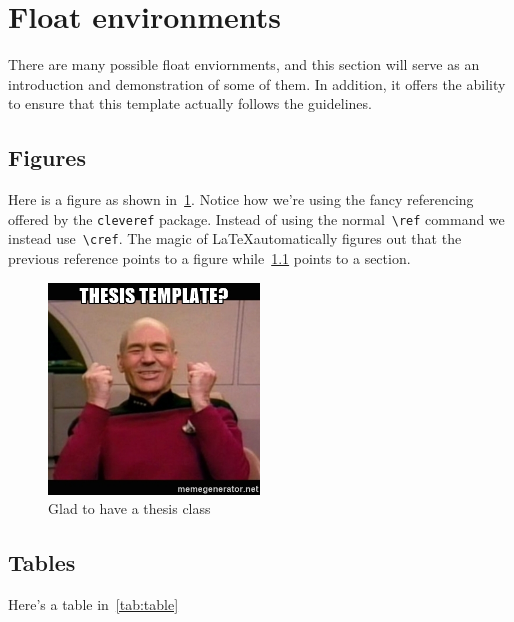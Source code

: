 \section{Float environments}
There are many possible float enviornments, and this section will serve as an introduction and demonstration of some of them.
In addition, it offers the ability to ensure that this template actually follows the guidelines.

\subsection{Figures}\label{ssec:figures}

Here is a figure as shown in~\cref{fig:picard}.
Notice how we're using the fancy referencing offered by the \verb+cleveref+ package. 
Instead of using the normal~\verb+\ref+ command we instead use~\verb+\cref+. 
The magic of \LaTeX automatically figures out that the previous reference points to a figure while~\cref{ssec:figures} points to a section.

\begin{figure}
    \centering
    \includegraphics[width=0.5\textwidth]{figures/picard_yes.jpg}
    \caption[Damage report!]{Glad to have a thesis class\label{fig:picard}}
\end{figure}

\subsection{Tables}\label{ssec:tables}

Here's a table in~\cref{tab:table}

